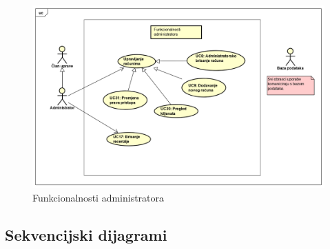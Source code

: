 					\begin{figure}[H]
						\includegraphics[width=\linewidth]{dijagrami/Funkcionalnosti_administratora.png}
						\centering
						\caption{Funkcionalnosti administratora}
						\label{fig:UseCaseDiagram4}
					\end{figure}
				
				\eject		
				
			\subsection{Sekvencijski dijagrami}
				
